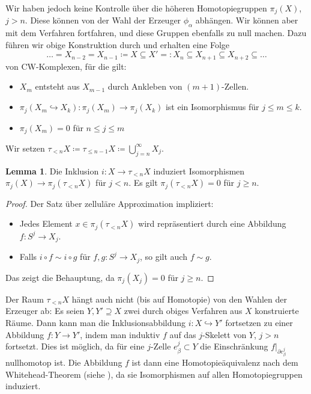 \documentclass[11pt, a4paper, german]{article}
\theoremstyle{definition}
\newtheorem{lem}{Lemma}
\theoremstyle{remark}
\newcommand{\trunc}[2]{\tau_{#1} #2} %
\begin{document}
Wir haben jedoch keine Kontrolle über die höheren Homotopiegruppen $\pi_j(X)$, $j > n$.
Diese können von der Wahl der Erzeuger $\phi_\alpha$ abhängen.
Wir können aber mit dem Verfahren fortfahren, und diese Gruppen ebenfalls zu null machen.
Dazu führen wir obige Konstruktion durch und erhalten eine Folge
\[ \ldots = X_{n-2} = X_{n-1} \coloneqq X \subseteq X' =: X_n \subseteq X_{n+1} \subseteq X_{n+2} \subseteq \ldots \]
von CW-Komplexen, für die gilt:
\begin{itemize}
  \item $X_m$ entsteht aus $X_{m-1}$ durch Ankleben von $(m{+}1)$-Zellen.
  \item $\pi_j(X_m \hookrightarrow X_k) : \pi_j(X_m) \to \pi_j(X_k)$ ist ein Isomorphismus für $j \leq m \leq k$.
  \item $\pi_j(X_m) = 0$ für $n \leq j \leq m$
\end{itemize}
Wir setzen $\trunc{< n}{X} \coloneqq \trunc{\leq n-1}{X} \coloneqq \bigcup_{j=n}^\infty X_j$.

\begin{lem}
  Die Inklusion $i : X \to \trunc{< n}{X}$ induziert Isomorphismen $\pi_j(X) \to \pi_j(\trunc{< n}{X})$ für $j < n$.
  Es gilt $\pi_j(\trunc{< n}{X}) = 0$ für $j \geq n$.
\end{lem}

\begin{proof}
  Der Satz über zelluläre Approximation impliziert:
  \begin{itemize}
    \item Jedes Element $x \in \pi_j(\trunc{< n}{X})$ wird repräsentiert durch eine Abbildung $f : S^j \to X_j$.
    \item Falls $i \circ f \sim i \circ g$ für $f, g : S^j \to X_j$, so gilt auch $f \sim g$.
  \end{itemize}
  Das zeigt die Behauptung, da $\pi_j(X_j) = 0$ für $j \geq n$.
\end{proof}

Der Raum $\trunc{< n}{X}$ hängt auch nicht (bis auf Homotopie) von den Wahlen der Erzeuger ab:
Es seien $Y, Y' \supseteq X$ zwei durch obiges Verfahren aus $X$ konstruierte Räume.
Dann kann man die Inklusionsabbildung $i : X \hookrightarrow Y'$ fortsetzen zu einer Abbildung $f : Y \to Y'$, indem man induktiv $f$ auf das $j$-Skelett von $Y$, $j > n$ fortsetzt.
Dies ist möglich, da für eine $j$-Zelle $e_\beta^j \subset Y$ die Einschränkung $f|_{\partial e_\beta^j}$ nullhomotop ist.
Die Abbildung $f$ ist dann eine Homotopieäquivalenz nach dem Whitehead-Theorem (siehe \cite[Thm 4.5]{hatcher:at}), da sie Isomorphismen auf allen Homotopiegruppen induziert.
\end{document}
